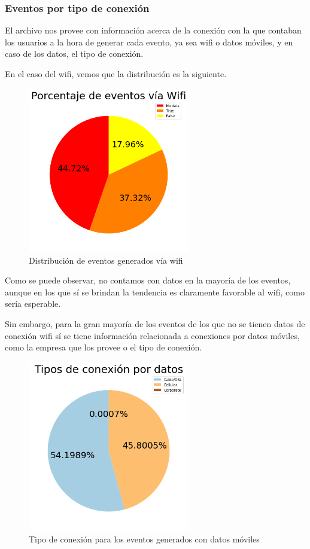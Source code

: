 \documentclass[a4paper, 12pt]{article}
\begin{document}
	\subsubsection{Eventos por tipo de conexión}
	
		El archivo nos provee con información acerca de la conexión con la que contaban los usuarios a la hora de generar cada evento, ya sea wifi o datos móviles, y en caso de los datos, el tipo de conexión.
	
		En el caso del wifi, vemos que la distribución es la siguiente.
	
		\FloatBarrier
		\begin{figure}[h]
			\centering
			\includegraphics[width=200pt]{images/events/eventosxwifi.png}
			\caption{Distribución de eventos generados vía wifi}
		\end{figure}
		\FloatBarrier
		
		Como se puede observar, no contamos con datos en la mayoría de los eventos, aunque en los que sí se brindan la tendencia es claramente favorable al wifi, como sería esperable.
		
		Sin embargo, para la gran mayoría de los eventos de los que no se tienen datos de conexión wifi sí se tiene información relacionada a conexiones por datos móviles, como la empresa que los provee o el tipo de conexión.
		
		\FloatBarrier
		\begin{figure}[h]
			\centering
			\includegraphics[width=200pt]{images/events/eventsxdatos.png}
			\caption{Tipo de conexión para los eventos generados con datos móviles}
		\end{figure}
		\FloatBarrier
		
\end{document}
